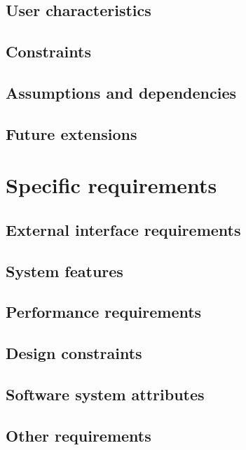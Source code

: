 \documentclass[12pt, a4paper]{report}
\begin{document}
\section{User characteristics}


\section{Constraints}


\section{Assumptions and dependencies}


\section{Future extensions}


\chapter{Specific requirements}
\label{ch:requirements}

\section{External interface requirements}


\section{System features}


\section{Performance requirements}


\section{Design constraints}


\section{Software system attributes}


\section{Other requirements}



\end{document}
